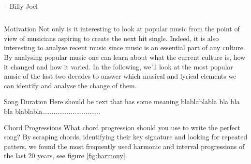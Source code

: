 \begin{frame}[t]
\centering
\textit{}\\ -- Billy Joel
\begin{columns}
\begin{column}{0.49\textwidth}
    \begin{block}{Motivation} 
        Not only is it interesting to look at popular music from the point of view of musicians aspiring to create the next hit single. Indeed, it is also interesting to analyse recent music since music is an essential part of any culture.
        By analysing popular music one can learn about what the current culture is, how it changed and how it varied.
        In the following, we'll look at the most popular music of the last two decades to answer which musical and lyrical elements we can identify and analyse the change of them.
    \end{block}
    \begin{block}{Song Duration}
    Here should be text that has some meaning blablablabla bla bla bla blablabla...............................
    \end{block}
    \begin{block}{Chord Progressions}
    What chord progression should you use to write the perfect song? By scraping chords, identifying their key signature and looking for repeated patters, we found the most frequently used harmonic and interval progressions of the last 20 years, see figure \ref{fig:harmony}.
    \begin{figure}[hbt!]
        \centering

\end{figure}
\end{block}
\end{column}
\end{columns}
\end{frame}
